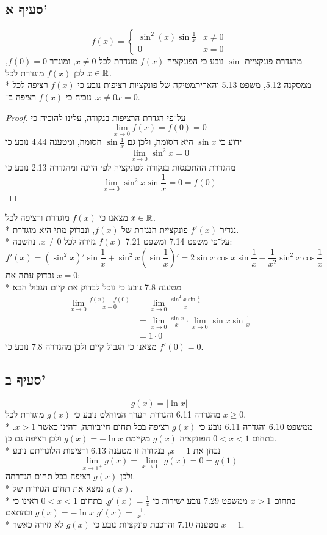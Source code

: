 \subsection{סעיף א'}
\[
	f(x) = \begin{cases}
		\sin^2(x) \sin \frac{1}{x} & x \ne 0 \\
		0 & x = 0
	\end{cases}
\]
מהגדרת פונקציית $\sin$ נובע כי הפונקציה $f(x)$ מוגדרת לכל $x \ne 0$, ומוגדר $f(0) = 0$, לכן $f(x)$ מוגדרת לכל $x \in \mathbb{R}$. \\*
ממסקנה 5.12, משפט 5.13 והאריתמטיקה של פונקציות רציפות נובע כי $f(x)$ רציפה לכל $x \ne 0$. נוכיח כי $f(x)$ רציפה ב־$x = 0$.
\begin{proof}
	על־פי הגדרת הרציפות בנקודה, עלינו להוכיח כי
	\[
		\lim_{x \to 0} f(x) = f(0) = 0
	\]
	ידוע כי $\sin x$ היא חסומה, ולכן גם $\sin \frac{1}{x}$ חסומה, ומטענה 4.44 נובע כי
	\[
		\lim_{x \to 0} \sin^2 x = 0
	\]
	מהגדרת ההתכנסות בנקודה לפונקציה לפי היינה ומהגדרה 2.13 נובע כי
	\[
		\lim_{x \to 0} \sin^2 x \sin \frac{1}{x} = 0 = f(0)
	\]
\end{proof}
מצאנו כי $f(x)$ מוגדרת ורציפה לכל $x \in \mathbb{R}$. \\*
נגדיר $f'(x)$ פונקציית הנגזרת של $f(x)$, ונבדוק מתי היא מוגדרת. \\*
על־פי משפט 7.14 ומשפט 7.21 $f(x)$ גזירה לכל $x \ne 0$. נחשבה:
\[
	f'(x) = (\sin^2 x)' \sin \frac{1}{x} + \sin^2 x (\sin \frac{1}{x})'
	= 2 \sin x \cos x \sin \frac{1}{x} - \frac{1}{x^2} \sin^2 x \cos \frac{1}{x}
\]
נבדוק עתה את $x = 0$: \\*
מטענה 7.8 נובע כי נוכל לבדוק את קיום הגבול הבא
\begin{align*}
	\lim_{x \to 0} \frac{f(x) - f(0)}{x - 0} & = \lim_{x \to 0} \frac{\sin^2 x \sin \frac{1}{x}}{x} \\
											 & = \lim_{x \to 0} \frac{\sin x}{x} \cdot \lim_{x \to 0} \sin x \sin \frac{1}{x} \\
											 & = 1 \cdot 0
\end{align*}
מצאנו כי הגבול קיים ולכן מהגדרה 7.8 נובע כי $f'(0) = 0$.

\subsection{סעיף ב'}
\[
	g(x) = |\ln x|
\]
מהגדרה 6.11 והגדרת הערך המוחלט נובע כי $g(x)$ מוגדרת לכל $x \ge 0$. \\*
ממשפט 6.10 והגדרה 6.11 נובע כי $g(x)$ רציפה בכל תחום חיוביותה, דהינו כאשר $x > 1$.
בתחום $0 < x < 1$ הפונקציה $g(x)$ מקיימת $g(x) = - \ln x$ ולכן רציפה גם כן. \\*
נבחן את $x = 1$, בנקודה זו מטענה 6.13 ורציפות הלוגריתם נובע
\[
	\lim_{x \to 1^+} g(x) = \lim_{x \to 1^-} g(x) = 0 = g(1)
\]
ולכן $g(x)$ רציפה בכל תחום הגדרתה. \\*
נמצא את תחום הגזירות של $g(x)$. \\*
בתחום $x > 1$ ממשפט 7.29 נובע ישירות כי $g'(x) = \frac{1}{x}$. בתחום $0 < x < 1$ ראינו כי $g(x) = - \ln x$ ובהתאם $g'(x) = \frac{-1}{x}$. \\*
מטענה 7.10 והרכבת פונקציות נובע כי $g(x)$ לא גזירה כאשר $x = 1$.

